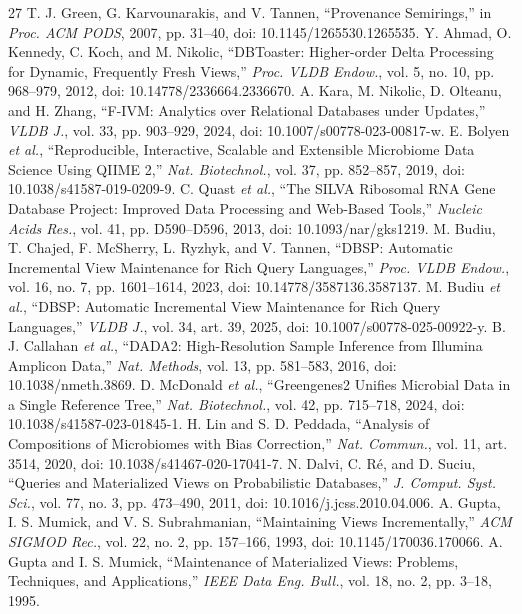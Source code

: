 \documentclass[conference]{IEEEtran}
\begin{document}
\begin{thebibliography}{27}
 T. J. Green, G. Karvounarakis, and V. Tannen, ``Provenance Semirings,'' in \emph{Proc. ACM PODS}, 2007, pp. 31--40, doi: 10.1145/1265530.1265535.
 Y. Ahmad, O. Kennedy, C. Koch, and M. Nikolic, ``DBToaster: Higher-order Delta Processing for Dynamic, Frequently Fresh Views,'' \emph{Proc. VLDB Endow.}, vol. 5, no. 10, pp. 968--979, 2012, doi: 10.14778/2336664.2336670.
 A. Kara, M. Nikolic, D. Olteanu, and H. Zhang, ``F-IVM: Analytics over Relational Databases under Updates,'' \emph{VLDB J.}, vol. 33, pp. 903--929, 2024, doi: 10.1007/s00778-023-00817-w.
 E. Bolyen \emph{et al.}, ``Reproducible, Interactive, Scalable and Extensible Microbiome Data Science Using QIIME 2,'' \emph{Nat. Biotechnol.}, vol. 37, pp. 852--857, 2019, doi: 10.1038/s41587-019-0209-9.
 C. Quast \emph{et al.}, ``The SILVA Ribosomal RNA Gene Database Project: Improved Data Processing and Web-Based Tools,'' \emph{Nucleic Acids Res.}, vol. 41, pp. D590--D596, 2013, doi: 10.1093/nar/gks1219.
 M. Budiu, T. Chajed, F. McSherry, L. Ryzhyk, and V. Tannen, ``DBSP: Automatic Incremental View Maintenance for Rich Query Languages,'' \emph{Proc. VLDB Endow.}, vol. 16, no. 7, pp. 1601--1614, 2023, doi: 10.14778/3587136.3587137.
 M. Budiu \emph{et al.}, ``DBSP: Automatic Incremental View Maintenance for Rich Query Languages,'' \emph{VLDB J.}, vol. 34, art. 39, 2025, doi: 10.1007/s00778-025-00922-y.
 B. J. Callahan \emph{et al.}, ``DADA2: High-Resolution Sample Inference from Illumina Amplicon Data,'' \emph{Nat. Methods}, vol. 13, pp. 581--583, 2016, doi: 10.1038/nmeth.3869.
 D. McDonald \emph{et al.}, ``Greengenes2 Unifies Microbial Data in a Single Reference Tree,'' \emph{Nat. Biotechnol.}, vol. 42, pp. 715--718, 2024, doi: 10.1038/s41587-023-01845-1.
 H. Lin and S. D. Peddada, ``Analysis of Compositions of Microbiomes with Bias Correction,'' \emph{Nat. Commun.}, vol. 11, art. 3514, 2020, doi: 10.1038/s41467-020-17041-7.
 N. Dalvi, C. R\'e, and D. Suciu, ``Queries and Materialized Views on Probabilistic Databases,'' \emph{J. Comput. Syst. Sci.}, vol. 77, no. 3, pp. 473--490, 2011, doi: 10.1016/j.jcss.2010.04.006.
 A. Gupta, I. S. Mumick, and V. S. Subrahmanian, ``Maintaining Views Incrementally,'' \emph{ACM SIGMOD Rec.}, vol. 22, no. 2, pp. 157--166, 1993, doi: 10.1145/170036.170066.
 A. Gupta and I. S. Mumick, ``Maintenance of Materialized Views: Problems, Techniques, and Applications,'' \emph{IEEE Data Eng. Bull.}, vol. 18, no. 2, pp. 3--18, 1995.

\end{thebibliography}
\end{document}
